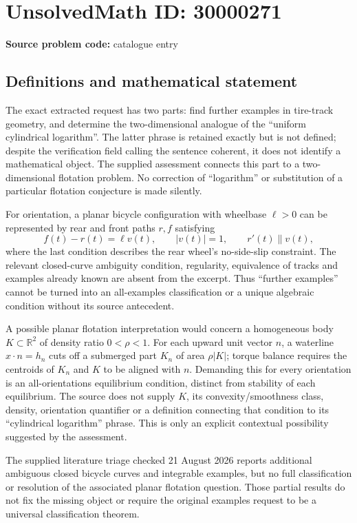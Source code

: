 \documentclass[11pt]{article}
\newcommand{\R}{\mathbb{R}}
\begin{document}
\section*{UnsolvedMath ID: 30000271}
\textbf{Source problem code:} catalogue entry
\subsection{Definitions and mathematical statement}
The exact extracted request has two parts: find further examples in tire-track geometry, and determine the two-dimensional analogue of the ``uniform cylindrical logarithm''. The latter phrase is retained exactly but is not defined; despite the verification field calling the sentence coherent, it does not identify a mathematical object. The supplied assessment connects this part to a two-dimensional flotation problem. No correction of ``logarithm'' or substitution of a particular flotation conjecture is made silently.

For orientation, a planar bicycle configuration with wheelbase $\ell>0$ can be represented by rear and front paths $r,f$ satisfying
\[
 f(t)-r(t)=\ell v(t),\qquad |v(t)|=1,\qquad
 r'(t)\parallel v(t),
\]
where the last condition describes the rear wheel's no-side-slip constraint. The relevant closed-curve ambiguity condition, regularity, equivalence of tracks and examples already known are absent from the excerpt. Thus ``further examples'' cannot be turned into an all-examples classification or a unique algebraic condition without its source antecedent.

A possible planar flotation interpretation would concern a homogeneous body $K\subset\R^2$ of density ratio $0<\rho<1$. For each upward unit vector $n$, a waterline $x\cdot n=h_n$ cuts off a submerged part $K_n$ of area $\rho|K|$; torque balance requires the centroids of $K_n$ and $K$ to be aligned with $n$. Demanding this for every orientation is an all-orientations equilibrium condition, distinct from stability of each equilibrium. The source does not supply $K$, its convexity/smoothness class, density, orientation quantifier or a definition connecting that condition to its ``cylindrical logarithm'' phrase. This is only an explicit contextual possibility suggested by the assessment.

The supplied literature triage checked 21 August 2026 reports additional ambiguous closed bicycle curves and integrable examples, but no full classification or resolution of the associated planar flotation question. Those partial results do not fix the missing object or require the original examples request to be a universal classification theorem.
\end{document}

